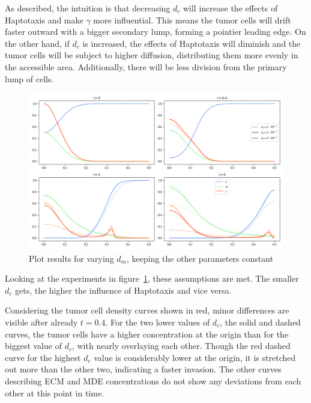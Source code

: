 As described, the intuition is that decreasing $d_c$ will increase the effects of Haptotaxis and make $\gamma$ more influential. This means the tumor cells will drift faster outward with a bigger secondary lump, forming a pointier leading edge. On the other hand, if $d_c$ is increased, the effects of Haptotaxis will diminish and the tumor cells will be subject to higher diffusion, distributing them more evenly in the accessible area. Additionally, there will be less division from the primary lump of cells. 
\begin{figure}[h!]
 \centering
 \includegraphics[width=\textwidth]{resources/images/dc_variation.png}
 \caption{Plot results for varying $d_m$, keeping the other parameters constant}
 \label{fig:dc_variation}
\end{figure}
Looking at the experiments in figure~\ref{fig:dc_variation}, these assumptions are met. The smaller $d_c$ gets, the higher the influence of Haptotaxis and vice versa.

Considering the tumor cell density curves shown in red, minor differences are visible after already $t=0.4$. For the two lower values of $d_c$, the solid and dashed curves, the tumor cells have a higher concentration at the origin than for the biggest value of $d_c$, with nearly overlaying each other. Though the red dashed curve for the highest $d_c$ value is considerably lower at the origin, it is stretched out more than the other two, indicating a faster invasion. The other curves describing ECM and MDE concentrations do not show any deviations from each other at this point in time.

